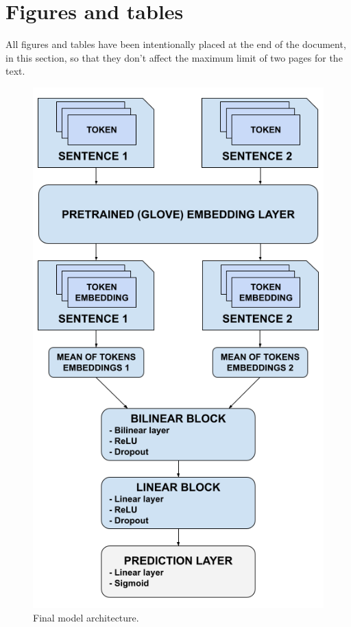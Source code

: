 \documentclass[11pt,a4paper]{article}
\begin{document}
	\section{Figures and tables}
	All figures and tables have been intentionally placed at the end of the document, in this section, so that they don't affect the maximum limit of two pages for the text.
	\begin{figure}[H]
		\centering
		\includegraphics[width=1\columnwidth]{bilinear_model.png}
		\caption{Final model architecture.}
		\label{fig:architecture}
	\end{figure}
\end{document}
